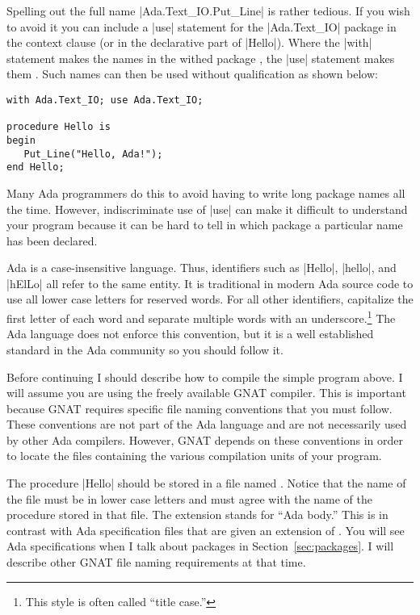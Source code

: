 Spelling out the full name |Ada.Text_IO.Put_Line| is rather tedious. If you wish to avoid it you
can include a |use| statement for the |Ada.Text_IO| package in the context clause (or in the
declarative part of |Hello|). Where the |with| statement makes the names in the withed package
, the |use| statement makes them . Such names can
then be used without qualification as shown below:

\begin{lstlisting}
with Ada.Text_IO; use Ada.Text_IO;

procedure Hello is
begin
   Put_Line("Hello, Ada!");
end Hello;
\end{lstlisting}

\noindent Many Ada programmers do this to avoid having to write long package names all the time.
However, indiscriminate use of |use| can make it difficult to understand your program because it
can be hard to tell in which package a particular name has been declared.

Ada is a case-insensitive language. Thus, identifiers such as |Hello|, |hello|, and |hElLo| all
refer to the same entity. It is traditional in modern Ada source code to use all lower case
letters for reserved words. For all other identifiers, capitalize the first letter of each word
and separate multiple words with an underscore.\footnote{This style is often called ``title
  case.''} The Ada language does not enforce this convention, but it is a well established
standard in the Ada community so you should follow it.

Before continuing I should describe how to compile the simple program above. I will assume you
are using the freely available GNAT compiler. This is important because GNAT requires specific
file naming conventions that you must follow. These conventions are not part of the Ada language
and are not necessarily used by other Ada compilers. However, GNAT depends on these conventions
in order to locate the files containing the various compilation units of your program.

The procedure |Hello| should be stored in a file named . Notice that the
name of the file must be in lower case letters and must agree with the name of the procedure
stored in that file. The  extension stands for ``Ada body.'' This is in contrast
with Ada specification files that are given an extension of . You will see Ada
specifications when I talk about packages in Section~\ref{sec:packages}. I will describe other
GNAT file naming requirements at that time.

